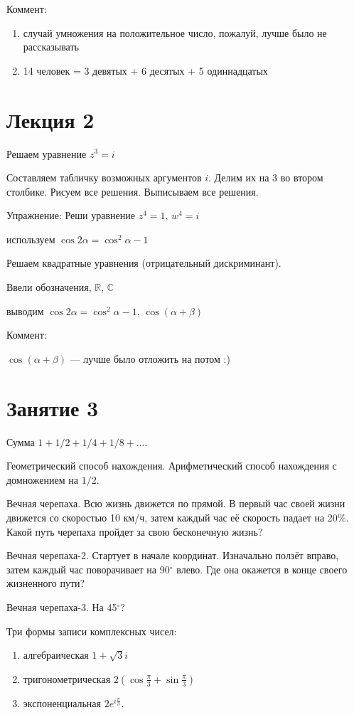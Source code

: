 \documentclass[12pt,a4paper]{article}
\begin{document}
Коммент:
\begin{enumerate}
\item случай умножения на положительное число, пожалуй, лучше было не рассказывать
\item 14 человек = 3 девятых + 6 десятых + 5 одиннадцатых
\end{enumerate}


\section{Лекция 2}


Решаем уравнение $z^3=i$

Составляем табличку возможных аргументов $i$. Делим их на 3 во втором столбике. Рисуем все решения. Выписываем все решения.

Упражнение:
Реши уравнение $z^4=1$,  $w^4=i$

используем $\cos 2\alpha =\cos^2 \alpha - 1$

Решаем квадратные уравнения (отрицательный дискриминант).

Ввели обозначения, $\mathbb{R}$, $\mathbb{C}$

выводим $\cos 2\alpha =\cos^2 \alpha - 1$, 
$\cos ( \alpha + \beta) $ 

Коммент: 

$\cos ( \alpha + \beta) $  --- лучше было отложить на потом :)

\section{Занятие 3}


Сумма $1+1/2+1/4+1/8+\ldots$. 

Геометрический способ нахождения. Арифметический способ нахождения с домножением на $1/2$.

Вечная черепаха. Всю жизнь движется по прямой. В первый час своей жизни движется со скоростью 10 км/ч, затем каждый час её скорость падает на 20\%. Какой путь черепаха пройдет за свою бесконечную жизнь?

Вечная черепаха-2. Стартует в начале координат. Изначально ползёт вправо, затем каждый час поворачивает на 90$^{\circ}$ влево. Где она окажется в конце своего жизненного пути?

Вечная черепаха-3. На 45$^{\circ}$? 


Три формы записи комплексных чисел:

\begin{enumerate}
\item алгебраическая $1+\sqrt{3}i$
\item тригонометрическая $2(\cos \frac{\pi}{3} + \sin \frac{\pi}{3} )$
\item экспоненциальная $2e^{i\frac{\pi}{3}}$.
\end{enumerate}
\end{document}
